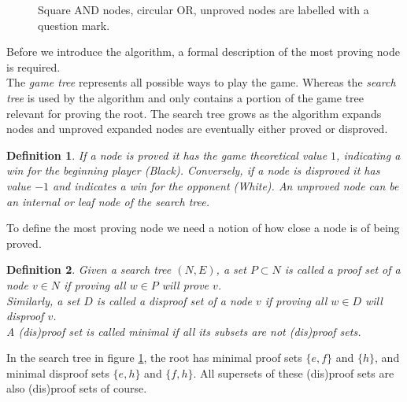 \documentclass{article}
\newtheorem{mydef}{Definition}
\begin{document}
\begin{figure}[h]
\center
{}
\caption{Square AND nodes, circular OR, unproved nodes are labelled with a question mark.}
\label{tree:pnex}
\end{figure}

Before we introduce the algorithm, a formal description of the most proving node is required.\\
The \textit{game tree} represents all possible ways to play the game. Whereas the \textit{search tree} is used by the algorithm
and only contains a portion of the game tree relevant for proving the root. The search tree grows as the algorithm expands nodes and
unproved expanded nodes are eventually either proved or disproved.
\begin{mydef}
If a node is proved it has the game theoretical value $1$, indicating a win for the beginning player (Black).
Conversely, if a node is disproved it has value $-1$ and indicates a win for the opponent (White).
An unproved node can be an internal or leaf node of the search tree.
\end{mydef}

To define the most proving node we need a notion of how close a node is of being proved.
\begin{mydef}
Given a search tree $(N, E)$, a set $P \subset N$ is called a proof set of a node $v \in N$ if proving all $w \in P$ will prove $v$.\\
Similarly, a set $D$ is called a disproof set of a node $v$ if proving all $w \in D$ will disproof $v$.\\
A (dis)proof set is called minimal if all its subsets are not (dis)proof sets.
\end{mydef}
In the search tree in figure \ref{tree:pnex}, the root has minimal proof sets $\{e, f\}$ and $\{h\}$,
and minimal disproof sets $\{e, h\}$ and $\{f, h\}$. All supersets of these (dis)proof sets are also (dis)proof sets of course.
\end{document}

